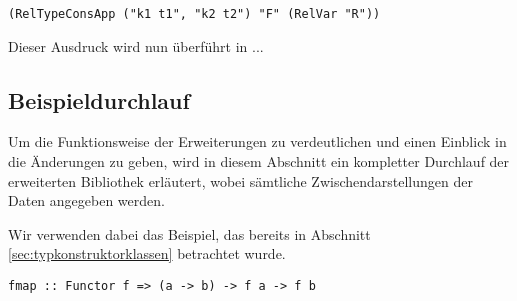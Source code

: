 \begin{verbatim}
(RelTypeConsApp ("k1 t1", "k2 t2") "F" (RelVar "R"))
\end{verbatim}

Dieser Ausdruck wird nun überführt in ...


\subsection{Beispieldurchlauf}

Um die Funktionsweise der Erweiterungen zu verdeutlichen und einen Einblick in die Änderungen zu geben, wird in diesem Abschnitt
ein kompletter Durchlauf der erweiterten Bibliothek erläutert, wobei sämtliche Zwischendarstellungen der Daten angegeben werden.

Wir verwenden dabei das Beispiel, das bereits in Abschnitt \ref{sec:typkonstruktorklassen} betrachtet wurde.

\begin{verbatim}
fmap :: Functor f => (a -> b) -> f a -> f b
\end{verbatim}

